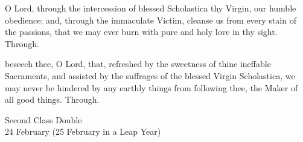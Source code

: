 \secret
{} O Lord, through the intercession of blessed Scholastica thy Virgin, our humble obedience; and, through the immaculate Victim, cleanse us from every stain of the passions, that we may ever burn with pure and holy love in thy sight. Through.


\postcommunion
{} beseech thee, O Lord, that, refreshed by the sweetness of thine ineffable Sacraments, and assisted by the suffrages of the blessed Virgin Scholastica, we may never be hindered by any earthly things from following thee, the Maker of all good things. Through.


\begin{inhead}
    {Second Class Double\\
24 February (25 February in a Leap Year)}
\end{inhead}

